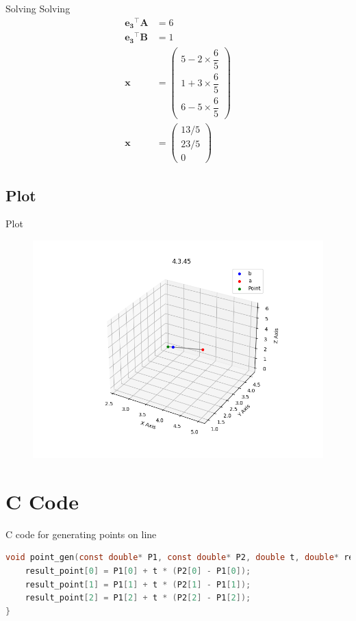 \documentclass{beamer}
\theoremstyle{remark}
\newcommand{\myvec}[1]{\ensuremath{\begin{pmatrix}#1\end{pmatrix}}}
\let\vec\mathbf
\numberwithin{equation}{section}
\begin{document}
\begin{frame}{Solving}
Solving
\begin{align}
\vec{e_3}^\top\vec{A} &= 6 \\
\vec{e_3}^\top\vec{B} &= 1 \\
 \vec{x} &= \myvec{5-2\times\dfrac{6}{5} \\ 1+3\times\dfrac{6}{5} \\ 6-5\times\dfrac{6}{5}} \\
  \vec{x} &= \myvec{13/5 \\ 23/5 \\ 0}
\end{align}
\end{frame}

\subsection{Plot}
\begin{frame}{Plot}
 \begin{figure}[H]
    \centering
    \includegraphics[width=0.8\columnwidth]{../figs/plot.png}
    \caption*{}
    \label{fig:plot}
\end{figure}
\end{frame}

\section{C Code}
\begin{frame}[fragile]{C code for generating points on line}
\begin{lstlisting}[language=C]
 void point_gen(const double* P1, const double* P2, double t, double* result_point) {
    result_point[0] = P1[0] + t * (P2[0] - P1[0]);
    result_point[1] = P1[1] + t * (P2[1] - P1[1]);
    result_point[2] = P1[2] + t * (P2[2] - P1[2]);
}
\end{lstlisting}
\end{frame}
\end{document}
